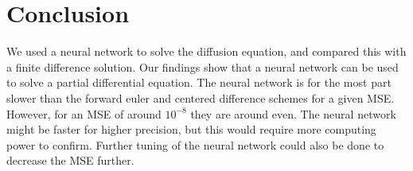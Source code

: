 \section{Conclusion}
\label{sec:conclusion}

We used a neural network to solve the diffusion equation, and compared this with a finite difference solution. Our findings show that a neural network can be used to solve a partial differential equation. The neural network is for the most part slower than the forward euler and centered difference schemes for a given MSE. However, for an MSE of around $10^{-8}$ they are around even. The neural network might be faster for higher precision, but this would require more computing power to confirm. Further tuning of the neural network could also be done to decrease the MSE further.
